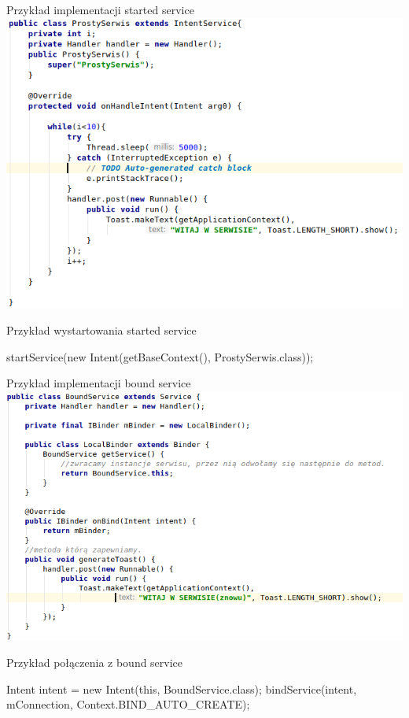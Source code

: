 \documentclass{beamer}
\begin{document}
\begin{frame}{Przykład implementacji started service}
	\centering
	\includegraphics[height=0.8\textheight]{started-service}
\end{frame}

\begin{frame}{Przykład wystartowania started service}
	\begin{block}{}
		startService(new Intent(getBaseContext(), ProstySerwis.class));
	\end{block}
\end{frame}

\begin{frame}{Przykład implementacji bound service}
	\centering
	\includegraphics[height=0.8\textheight]{bound-service}
\end{frame}

\begin{frame}{Przykład połączenia z bound service}
	\begin{block}{}
		Intent intent = new Intent(this, BoundService.class);
		bindService(intent, mConnection, Context.BIND\_AUTO\_CREATE);
	\end{block}
\end{frame}
\end{document}
